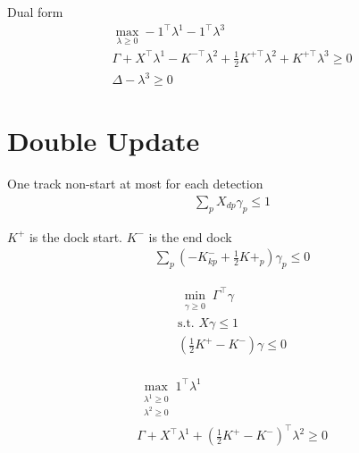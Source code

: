\documentclass{article}
\begin{document}
Dual form
\begin{align}
\max_{\lambda \geq 0}-1^{\top }\lambda^1-1^{\top}\lambda^{3}\\
\nonumber \Gamma+X^{\top}\lambda^1-K^{-\top}\lambda^2+\frac{1}{2}K^{+\top}\lambda^2 +K^{+\top}\lambda^3\geq 0\\
\nonumber \Delta -\lambda^3 \geq 0
\end{align}


\section {Double Update}

One track non-start at most for each detection
\begin{align}
\sum_{p} X_{dp}\gamma_p \leq 1
\end{align}

$K^+$ is the dock start.  $K^-$ is the end dock
\begin{align}
\sum_{p}(-K^-_{kp}+\frac{1}{2}K+_p)\gamma_p \leq 0
\end{align}

\begin{align}
\min_{\substack{\gamma \geq 0 }}\Gamma^{\top}\gamma \\
\nonumber \mbox{s.t.   } X\gamma \leq 1\\
\nonumber (\frac{1}{2}K^+  -K^-)\gamma \leq 0\\
\end{align}

\begin{align}
\max_{\substack{\lambda^1 \geq 0 \\ \lambda^2 \geq 0}}1^{\top }\lambda^1\\
\nonumber \Gamma+X^\top \lambda^1+(\frac{1}{2}K^+ -K^-)^{\top}\lambda^2	 \geq 0
\end{align}



\end{document}
